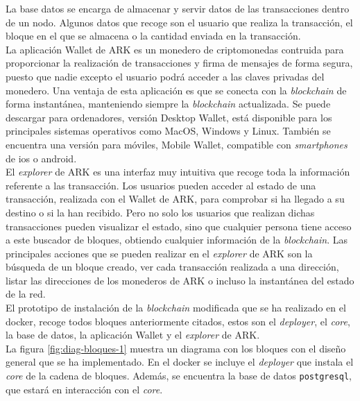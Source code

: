 \newpage
La base datos se encarga de almacenar y servir datos de las transacciones dentro de un nodo\cite{BD-ARK}. Algunos datos que recoge son el usuario que realiza la transacción, el bloque en el que se almacena o la cantidad enviada en la transacción.\\

La aplicación Wallet de ARK \cite{wallet} es un monedero de criptomonedas contruida para proporcionar la realización de transacciones y firma de mensajes de forma segura, puesto que nadie excepto el usuario podrá acceder a las claves privadas del monedero. Una ventaja de esta aplicación  es que se conecta con la \textit{blockchain} de forma instantánea, manteniendo siempre la \textit{blockchain} actualizada. Se puede descargar para ordenadores, versión Desktop Wallet, está disponible para los principales sistemas operativos como MacOS, Windows y Linux. También se encuentra una versión para móviles, Mobile Wallet, compatible con \textit{smartphones} de \acrshort{ios} o android.\\

El \textit{explorer} de ARK \cite{explorer} es una interfaz muy intuitiva que recoge toda la información referente a las transacción. Los usuarios pueden acceder al estado de una transacción, realizada con el Wallet de ARK, para comprobar si ha llegado a su destino o si la han recibido. Pero no solo los usuarios que realizan dichas transacciones pueden visualizar el estado, sino que cualquier persona tiene acceso a este buscador de bloques, obtiendo cualquier información de la \textit{blockchain}. Las principales acciones que se pueden realizar en el \textit{explorer} de ARK son la búsqueda de un bloque creado, ver cada transacción realizada a una dirección, listar las direcciones de los monederos de ARK o incluso la instantánea del estado de la red.\\

El prototipo de instalación de la \textit{blockchain} modificada que se ha realizado en el docker, recoge todos bloques anteriormente citados, estos son el \textit{deployer}, el \textit{core}, la base de datos, la aplicación Wallet y el \textit{explorer} de ARK.\\

La figura \ref{fig:diag-bloques-1} muestra un diagrama con los bloques con el diseño general que se ha implementado. En el docker se incluye el \textit{deployer} que instala el \textit{core} de la cadena de bloques. Además, se encuentra la base de datos \texttt{postgresql}, que estará en interacción con el \textit{core}.\\


